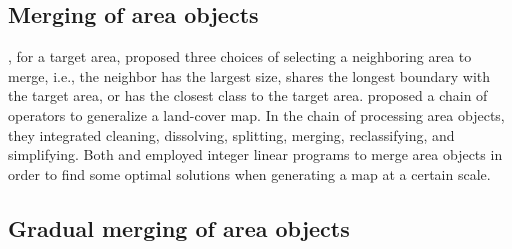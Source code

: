 \documentclass[twocolumn]{svjour3}          %
\begin{document}

\subsection{Merging of area objects}
\citet{Cheng2006}, for a target area, proposed three choices of 
selecting a neighboring area to merge, i.e.,
the neighbor has the largest size, 
shares the longest boundary with the target area,
or has the closest class to the target area.
\citet{Thiemann2018LandCover} proposed a chain of operators 
to generalize a land-cover map.
In the chain of processing area objects, 
they integrated cleaning, dissolving, splitting, 
merging, reclassifying, and simplifying.
Both \cite{HaunertWolff2010AreaAgg} and \cite{Oehrlein2017Aggregation} 
employed integer linear programs to merge area objects
in order to find some optimal solutions 
when generating a map at a certain scale.



\subsection{Gradual merging of area objects}
\label{sec:gradual_merge}
\end{document}
